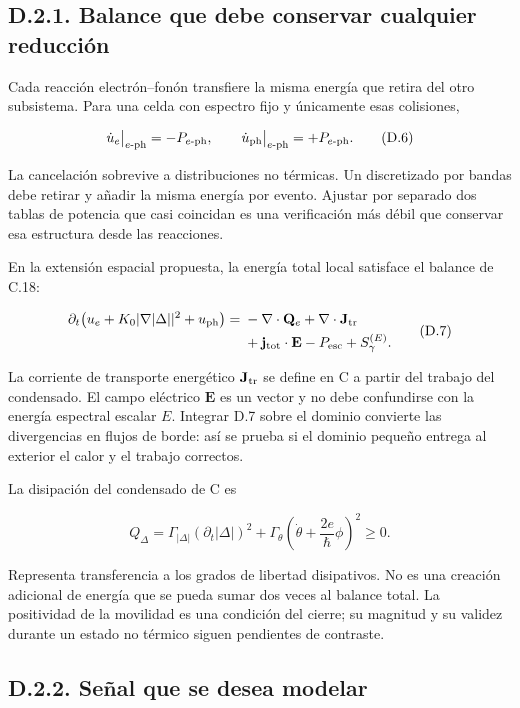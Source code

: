 \documentclass[
  spanish,
  10pt,
  a4paper,
]{article}
\begin{document}
\subsection{D.2.1. Balance que debe conservar cualquier
reducción}\label{d.2.1.-balance-que-debe-conservar-cualquier-reducciuxf3n}

Cada reacción electrón--fonón transfiere la misma energía que retira del
otro subsistema. Para una celda con espectro fijo y únicamente esas
colisiones,

\[
\dot u_e\big|_{e\text{-ph}}=-P_{e\text{-ph}},\qquad
\dot u_{\rm ph}\big|_{e\text{-ph}}=+P_{e\text{-ph}}.
\tag{D.6}
\]

La cancelación sobrevive a distribuciones no térmicas. Un discretizado
por bandas debe retirar y añadir la misma energía por evento. Ajustar
por separado dos tablas de potencia que casi coincidan es una
verificación más débil que conservar esa estructura desde las
reacciones.

En la extensión espacial propuesta, la energía total local satisface el
balance de C.18:

\[
\begin{aligned}
\partial_t\big(u_e+K_0|\nabla|\Delta||^2+u_{\rm ph}\big)
={}&-\nabla\cdot\mathbf Q_e+\nabla\cdot\mathbf J_{\rm tr}\\
&+\mathbf j_{\rm tot}\cdot\mathbf E-P_{\rm esc}+S_\gamma^{(E)}.
\end{aligned}\tag{D.7}
\]

La corriente de transporte energético \(\mathbf J_{\rm tr}\) se define
en C a partir del trabajo del condensado. El campo eléctrico
\(\mathbf E\) es un vector y no debe confundirse con la energía
espectral escalar \(E\). Integrar D.7 sobre el dominio convierte las
divergencias en flujos de borde: así se prueba si el dominio pequeño
entrega al exterior el calor y el trabajo correctos.

La disipación del condensado de C es

\[
Q_\Delta=\Gamma_{|\Delta|}(\partial_t|\Delta|)^2
+\Gamma_\theta\left(\dot\theta+\frac{2e}{\hbar}\phi\right)^2\geq0.
\tag{D.8}
\]

Representa transferencia a los grados de libertad disipativos. No es una
creación adicional de energía que se pueda sumar dos veces al balance
total. La positividad de la movilidad es una condición del cierre; su
magnitud y su validez durante un estado no térmico siguen pendientes de
contraste.

\subsection{D.2.2. Señal que se desea
modelar}\label{d.2.2.-seuxf1al-que-se-desea-modelar}
\end{document}
